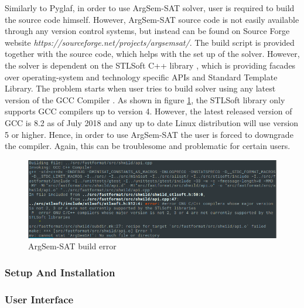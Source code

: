 Similarly to Pyglaf, in order to use ArgSem-SAT solver, user is required to build the source code himself. However, ArgSem-SAT source code is not easily available through any version control systems, but instead can be found on Source Forge website \textit{https://sourceforge.net/projects/argsemsat/}. The build script is provided together with the source code, which helps with the set up of the solver. However, the solver is dependent on the STLSoft C++ library \citep{stlsoft}, which is providing facades over operating-system and technology specific APIs and Standard Template Library. The problem starts when user tries to build solver using any latest version of the GCC Compiler \citep{gcc}. As shown in figure \ref{fig:argsemsatBuildError}, the STLSoft library only supports GCC compilers up to version 4. However, the latest released version of GCC is 8.2 as of July 2018 \citep{gcc} and any up to date Linux distribution will use version 5 or higher. Hence, in order to use ArgSem-SAT the user is forced to downgrade the compiler. Again, this can be troublesome and problematic for certain users.

\begin{figure}[h]
	\centering
	\includegraphics[width=\linewidth]{"img/argsemsat_error"}
	\caption{ArgSem-SAT build error}
	\label{fig:argsemsatBuildError}
\end{figure}

\subsubsection{Setup And Installation}

\subsubsection{User Interface}

